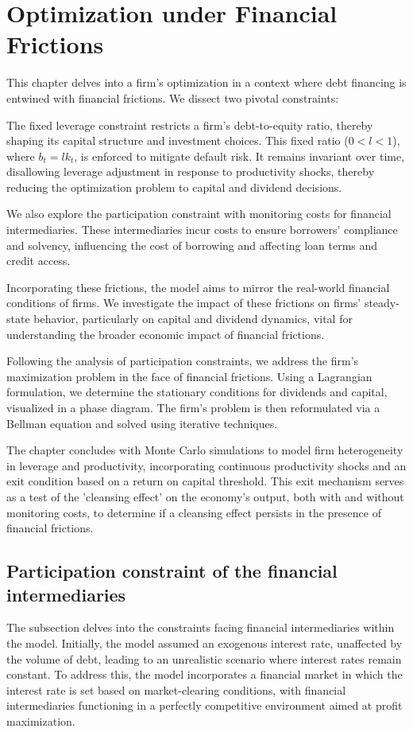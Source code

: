 \documentclass[12pt]{report}
\begin{document}
\chapter{Optimization under Financial Frictions}
This chapter delves into a firm's optimization in a context where debt financing is entwined with financial frictions.
We dissect two pivotal constraints:

The fixed leverage constraint restricts a firm's debt-to-equity ratio, thereby shaping its capital structure and
investment choices. This fixed ratio (\(0<l<1\)), where \(b_t = l k_t\), is enforced to mitigate default risk. It
remains invariant over time, disallowing leverage adjustment in response to productivity shocks, thereby reducing the
optimization problem to capital and dividend decisions. 

We also explore the participation constraint with monitoring costs for financial intermediaries. These intermediaries
incur costs to ensure borrowers' compliance and solvency, influencing the cost of borrowing and affecting loan terms
and credit access.

Incorporating these frictions, the model aims to mirror the real-world financial conditions of firms. We investigate the
impact of these frictions on firms' steady-state behavior, particularly on capital and dividend dynamics, vital for
understanding the broader economic impact of financial frictions. 

Following the analysis of participation constraints, we address the firm's maximization problem in the face of financial
frictions. Using a Lagrangian formulation, we determine the stationary conditions for dividends and capital, visualized
in a phase diagram. The firm's problem is then reformulated via a Bellman equation and solved using iterative
techniques. 

The chapter concludes with Monte Carlo simulations to model firm heterogeneity in leverage and productivity,
incorporating continuous productivity shocks and an exit condition based on a return on capital threshold. This exit
mechanism serves as a test of the 'cleansing effect' on the economy's output, both with and without monitoring costs, to
determine if a cleansing effect persists in the presence of financial frictions. 
\section{Participation constraint of the financial intermediaries } 
The subsection delves into the constraints facing financial intermediaries within the model. Initially, the model assumed an exogenous
interest rate, unaffected by the volume of debt, leading to an unrealistic scenario where interest rates remain
constant.  To address this,  the model incorporates a financial market in which the interest rate is set based on
market-clearing conditions, with financial intermediaries functioning in a perfectly competitive environment aimed at
profit maximization. 
\end{document}
